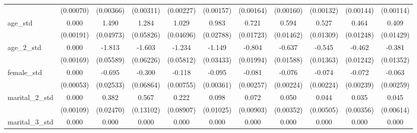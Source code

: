 {\begin{tabular}{l*{10}{c}}
                    &   (0.00070)         &   (0.00366)         &   (0.00311)         &   (0.00227)         &   (0.00157)         &   (0.00164)         &   (0.00160)         &   (0.00132)         &   (0.00144)         &   (0.00114)         \\
age\_std             &       0.000         &       1.490\sym{***}&       1.284\sym{***}&       1.029\sym{***}&       0.983\sym{***}&       0.721\sym{***}&       0.594\sym{***}&       0.527\sym{***}&       0.464\sym{***}&       0.409\sym{***}\\
                    &   (0.00191)         &   (0.04973)         &   (0.05826)         &   (0.04696)         &   (0.02788)         &   (0.01723)         &   (0.01462)         &   (0.01309)         &   (0.01248)         &   (0.01429)         \\
age\_2\_std           &       0.000         &      -1.813\sym{***}&      -1.603\sym{***}&      -1.234\sym{***}&      -1.149\sym{***}&      -0.804\sym{***}&      -0.637\sym{***}&      -0.545\sym{***}&      -0.462\sym{***}&      -0.381\sym{***}\\
                    &   (0.00169)         &   (0.05589)         &   (0.06226)         &   (0.05812)         &   (0.03433)         &   (0.01994)         &   (0.01588)         &   (0.01363)         &   (0.01242)         &   (0.01352)         \\
female\_std          &       0.000         &      -0.695\sym{***}&      -0.300\sym{***}&      -0.118\sym{***}&      -0.095\sym{***}&      -0.081\sym{***}&      -0.076\sym{***}&      -0.074\sym{***}&      -0.072\sym{***}&      -0.063\sym{***}\\
                    &   (0.00053)         &   (0.02533)         &   (0.06864)         &   (0.00755)         &   (0.00361)         &   (0.00257)         &   (0.00224)         &   (0.00224)         &   (0.00239)         &   (0.00259)         \\
marital\_2\_std       &       0.000         &       0.382\sym{***}&       0.567\sym{***}&       0.222\sym{*}  &       0.098\sym{***}&       0.072\sym{***}&       0.050\sym{***}&       0.044\sym{***}&       0.035\sym{***}&       0.045\sym{***}\\
                    &   (0.00109)         &   (0.02470)         &   (0.13102)         &   (0.08907)         &   (0.01025)         &   (0.00903)         &   (0.00352)         &   (0.00505)         &   (0.00356)         &   (0.00614)         \\
marital\_3\_std       &       0.000         &       0.000         &       0.000         &       0.000         &       0.000         &       0.000         &       0.000         &       0.000         &       0.000         &       0.000         \\

\end{tabular}}
